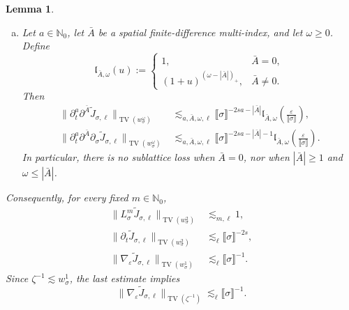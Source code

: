 \documentclass{article}
\numberwithin{equation}{section}
\newcommand{\assign}{:=}
\theoremstyle{plain}
\newtheorem{lemma}[theorem]{Lemma}
\theoremstyle{definition}
\begin{document}
\begin{lemma}
\begin{enumerate}[(a)]
		\item Let \(a\in\mathbb N_0\), let \(\bar A\) be a spatial
		finite-difference multi-index, and let
		\(\omega\geq0\).  Define
		\[
		\mathfrak l_{\bar A,\omega}(u)
		\assign
		\begin{cases}
			1, & \bar A=0,\\
			(1+u)^{(\omega-|\bar A|)_+}, & \bar A\neq0.
		\end{cases}
		\]
		Then
		\begin{align}
			\|\partial_t^a\partial^{\bar A}
			\tilde J_{\sigma,\ell}\|_{\operatorname{TV}(w_\sigma^\omega)}
			&\lesssim_{a,\bar A,\omega,\ell}
			\llbracket\sigma\rrbracket^{-2sa-|\bar A|}
			\mathfrak l_{\bar A,\omega}
			\left(\frac{\varepsilon}{\llbracket\sigma\rrbracket}\right),
			\label{eq:J-decay-corrected-TV}
			\\
			\|\partial_t^a\partial^{\bar A}\partial_\sigma
			\tilde J_{\sigma,\ell}\|_{\operatorname{TV}(w_\sigma^\omega)}
			&\lesssim_{a,\bar A,\omega,\ell}
			\llbracket\sigma\rrbracket^{-2sa-|\bar A|-1}
			\mathfrak l_{\bar A,\omega}
			\left(\frac{\varepsilon}{\llbracket\sigma\rrbracket}\right).
			\label{eq:J-decay-corrected-sigma-TV}
		\end{align}
		In particular, there is no sublattice loss when \(\bar A=0\), nor when
		\(|\bar A|\geq1\) and \(\omega\leq |\bar A|\).
	\end{enumerate}
	Consequently, for every fixed \(m\in\mathbb N_0\),
	\begin{align}
		\|L_\sigma^m\tilde J_{\sigma,\ell}\|
		_{\operatorname{TV}(w_\sigma^2)}
		&\lesssim_{m,\ell}1,
		\label{eq:J-decay-corrected-Lm}
		\\
		\|\partial_t\tilde J_{\sigma,\ell}\|
		_{\operatorname{TV}(w_\sigma^2)}
		&\lesssim_\ell\llbracket\sigma\rrbracket^{-2s},
		\label{eq:J-decay-corrected-time}
		\\
		\|\nabla_\varepsilon\tilde J_{\sigma,\ell}\|
		_{\operatorname{TV}(w_\sigma^1)}
		&\lesssim_\ell\llbracket\sigma\rrbracket^{-1}.
		\label{eq:J-decay-corrected-gradient}
	\end{align}
	Since \(\zeta^{-1}\lesssim w_\sigma^1\), the last estimate implies
	\[
	\|\nabla_\varepsilon\tilde J_{\sigma,\ell}\|
	_{\operatorname{TV}(\zeta^{-1})}
	\lesssim_\ell\llbracket\sigma\rrbracket^{-1}.
	\]
\end{lemma}
\end{document}
